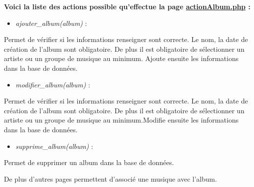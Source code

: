 			\begin{paragraphe}
                \textbf{Voici la liste des actions possible qu'effectue la page \underline{actionAlbum.php} :}
            
                \begin{itemize}
                    \item \emph{ajouter\_album(album)} :
                \end{itemize}
                \begin{paragraphe}
                    Permet de vérifier si les informations renseigner sont correcte. Le nom, la date de création de l'album sont obligatoire. De plus il est obligatoire de sélectionner un artiste ou un groupe de musique au minimum. Ajoute ensuite les informations dans la base de données.
                \end{paragraphe}
                
                \begin{itemize}
                    \item \emph{modifier\_album(album)} :
                \end{itemize}
                \begin{paragraphe}
                    Permet de vérifier si les informations renseigner sont correcte. Le nom, la date de création de l'album sont obligatoire. De plus il est obligatoire de sélectionner un artiste ou un groupe de musique au minimum.Modifie ensuite les informations dans la base de données.
                \end{paragraphe}
                
                \begin{itemize}
                    \item \emph{supprime\_album(album)} :
                \end{itemize}
                \begin{paragraphe}
                    Permet de supprimer un album dans la base de données.
                \end{paragraphe}
            \end{paragraphe}
            
            \begin{paragraphe}
                De plus d'autres pages permettent d'associé une musique avec l'album.
            \end{paragraphe}


